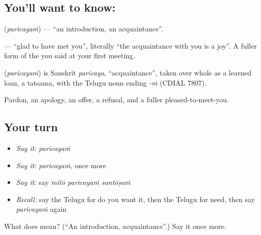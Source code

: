 \subsection*{You'll want to know: }
\textbf{} (\emph{paricayaṁ}) — \textquotedblleft{}an introduction, an acquaintance\textquotedblright{}.

\textbf{  } — \textquotedblleft{}glad to have met you\textquotedblright{}, literally \textquotedblleft{}the acquaintance with you is a joy\textquotedblright{}. A fuller form of the \textbf{} you said at your first meeting.

\begin{cousinweb}
\textbf{} (\emph{paricayaṁ}) is Sanskrit \emph{paricaya}, \textquotedblleft{}acquaintance\textquotedblright{}, taken over whole as a learned loan, a tatsama, with the Telugu noun ending \emph{-ṁ} (CDIAL 7807).
\end{cousinweb}

\begin{grammarlens}[title={What you've built}]
Pardon, an apology, an offer, a refusal, and a fuller pleased-to-meet-you.
\end{grammarlens}

\subsection*{Your turn}
\begin{itemize}
\raggedright
  \item \emph{Say it:} \emph{paricayaṁ}
  \item \emph{Say it:} \emph{paricayaṁ}, once more
  \item \emph{Say it:} say \emph{mītō paricayaṁ santōṣaṁ}
  \item \emph{Recall:} say the Telugu for do you want it, then the Telugu for need, then say \emph{paricayaṁ} again
\end{itemize}

\begin{tcolorbox}[breakable,colback=teal!4,colframe=teal!35!black,title={Before you move on}]
What does  mean? (\textquotedblleft{}An introduction, acquaintance\textquotedblright{}.) Say it once more.
\end{tcolorbox}
